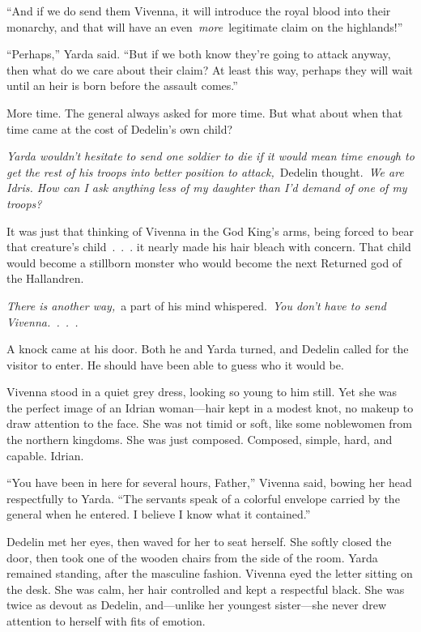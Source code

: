 “And if we do send them Vivenna, it will introduce the royal blood into their monarchy, and that will have an even~\textit{more}~legitimate claim on the highlands!”

“Perhaps,” Yarda said. “But if we both know they’re going to attack anyway, then what do we care about their claim? At least this way, perhaps they will wait until an heir is born before the assault comes.”

More time. The general always asked for more time. But what about when that time came at the cost of Dedelin’s own child?

\textit{Yarda wouldn’t hesitate to send one soldier to die if it would mean time enough to get the rest of his troops into better position to attack,}~Dedelin thought.~\textit{We are Idris. How can I ask anything less of my daughter than I’d demand of one of my troops?}

It was just that thinking of Vivenna in the God King’s arms, being forced to bear that creature’s child~.~.~. it nearly made his hair bleach with concern. That child would become a stillborn monster who would become the next Returned god of the Hallandren.

\textit{There is another way,}~a part of his mind whispered.~\textit{You don’t have to send Vivenna.~.~.~.}

A knock came at his door. Both he and Yarda turned, and Dedelin called for the visitor to enter. He should have been able to guess who it would be.

Vivenna stood in a quiet grey dress, looking so young to him still. Yet she was the perfect image of an Idrian woman—hair kept in a modest knot, no makeup to draw attention to the face. She was not timid or soft, like some noblewomen from the northern kingdoms. She was just composed. Composed, simple, hard, and capable. Idrian.

“You have been in here for several hours, Father,” Vivenna said, bowing her head respectfully to Yarda. “The servants speak of a colorful envelope carried by the general when he entered. I believe I know what it contained.”

Dedelin met her eyes, then waved for her to seat herself. She softly closed the door, then took one of the wooden chairs from the side of the room. Yarda remained standing, after the masculine fashion. Vivenna eyed the letter sitting on the desk. She was calm, her hair controlled and kept a respectful black. She was twice as devout as Dedelin, and—unlike her youngest sister—she never drew attention to herself with fits of emotion.

